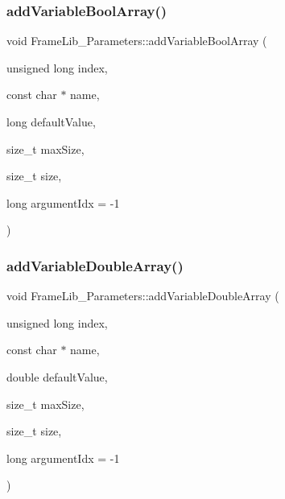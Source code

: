 \subsubsection{\texorpdfstring{add\+Variable\+Bool\+Array()}{addVariableBoolArray()}}
{\footnotesize\ttfamily void Frame\+Lib\+\_\+\+Parameters\+::add\+Variable\+Bool\+Array (\begin{DoxyParamCaption}\item[{unsigned long}]{index,  }\item[{const char $\ast$}]{name,  }\item[{long}]{default\+Value,  }\item[{size\+\_\+t}]{max\+Size,  }\item[{size\+\_\+t}]{size,  }\item[{long}]{argument\+Idx = {\ttfamily -\/1} }\end{DoxyParamCaption})\hspace{0.3cm}{\ttfamily [inline]}}

\mbox{\label{class_frame_lib___parameters_afefc06df8236e718674b7d7adac313ec}} 
\subsubsection{\texorpdfstring{add\+Variable\+Double\+Array()}{addVariableDoubleArray()}}
{\footnotesize\ttfamily void Frame\+Lib\+\_\+\+Parameters\+::add\+Variable\+Double\+Array (\begin{DoxyParamCaption}\item[{unsigned long}]{index,  }\item[{const char $\ast$}]{name,  }\item[{double}]{default\+Value,  }\item[{size\+\_\+t}]{max\+Size,  }\item[{size\+\_\+t}]{size,  }\item[{long}]{argument\+Idx = {\ttfamily -\/1} }\end{DoxyParamCaption})\hspace{0.3cm}{\ttfamily [inline]}}

\mbox{\label{class_frame_lib___parameters_abd0359eb3df2b07acf25ef5d1f2873fe}} 
